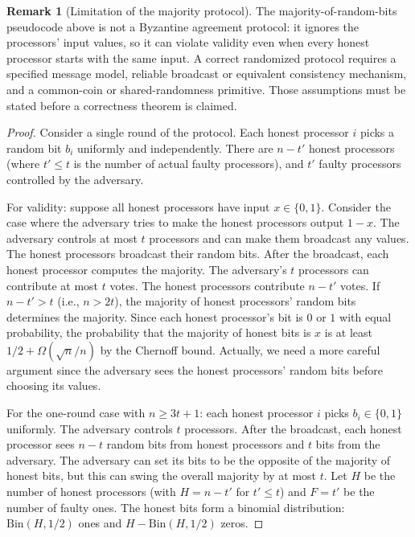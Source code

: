 \documentclass[twoside,12pt]{book}
\theoremstyle{plain}
\theoremstyle{definition}
\newtheorem{remark}[theorem]{Remark}
\theoremstyle{remark}
\begin{document}
\begin{remark}[Limitation of the majority protocol]
\label{thm:random-byzantine}
The majority-of-random-bits pseudocode above is not a Byzantine agreement
protocol: it ignores the processors' input values, so it can violate validity
even when every honest processor starts with the same input. A correct
randomized protocol requires a specified message model, reliable broadcast or
equivalent consistency mechanism, and a common-coin or shared-randomness
primitive. Those assumptions must be stated before a correctness theorem is
claimed.
\iffalse

\begin{proof}
Consider a single round of the protocol. Each honest processor $i$ picks a random bit $b_i$ uniformly and independently. There are $n - t'$ honest processors (where $t' \leq t$ is the number of actual faulty processors), and $t'$ faulty processors controlled by the adversary. 

For validity: suppose all honest processors have input $x \in \{0, 1\}$. Consider the case where the adversary tries to make the honest processors output $1 - x$. The adversary controls at most $t$ processors and can make them broadcast any values. The honest processors broadcast their random bits. After the broadcast, each honest processor computes the majority. The adversary's $t$ processors can contribute at most $t$ votes. The honest processors contribute $n - t'$ votes. If $n - t' > t$ (i.e., $n > 2t$), the majority of honest processors' random bits determines the majority. Since each honest processor's bit is $0$ or $1$ with equal probability, the probability that the majority of honest bits is $x$ is at least $1/2 + \Omega(\sqrt{n}/n)$ by the Chernoff bound. Actually, we need a more careful argument since the adversary sees the honest processors' random bits before choosing its values.

For the one-round case with $n \geq 3t + 1$: each honest processor $i$ picks $b_i \in \{0, 1\}$ uniformly. The adversary controls $t$ processors. After the broadcast, each honest processor sees $n - t$ random bits from honest processors and $t$ bits from the adversary. The adversary can set its bits to be the opposite of the majority of honest bits, but this can swing the overall majority by at most $t$. Let $H$ be the number of honest processors (with $H = n - t'$ for $t' \leq t$) and $F = t'$ be the number of faulty ones. The honest bits form a binomial distribution: $\text{Bin}(H, 1/2)$ ones and $H - \text{Bin}(H, 1/2)$ zeros.


\end{proof}
\end{remark}
\end{document}

